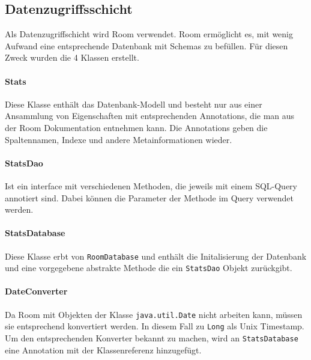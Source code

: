 \subsection{Datenzugriffsschicht}
Als Datenzugriffschicht wird Room verwendet. Room ermöglicht es, mit wenig
Aufwand eine entsprechende Datenbank mit Schemas zu befüllen. Für diesen
Zweck wurden die 4 Klassen erstellt.

\paragraph{Stats}
Diese Klasse enthält das Datenbank-Modell und besteht nur aus einer
Ansammlung von Eigenschaften mit entsprechenden Annotations, die man aus
der Room Dokumentation entnehmen kann. Die Annotations geben die
Spaltennamen, Indexe und andere Metainformationen wieder.

\paragraph{StatsDao}
Ist ein interface mit verschiedenen Methoden, die jeweils mit einem
SQL-Query annotiert sind. Dabei können die Parameter der Methode im Query
verwendet werden.

\paragraph{StatsDatabase}
Diese Klasse erbt von \texttt{RoomDatabase} und enthält die Initalisierung
der Datenbank und eine vorgegebene abstrakte Methode die ein \texttt{StatsDao}
Objekt zurückgibt.

\paragraph{DateConverter}
Da Room mit Objekten der Klasse \texttt{java.util.Date} nicht arbeiten kann,
müssen sie entsprechend konvertiert werden. In diesem Fall zu \texttt{Long}
als Unix Timestamp. Um den entsprechenden Konverter bekannt zu machen, wird
an \texttt{StatsDatabase} eine Annotation mit der Klassenreferenz hinzugefügt.


